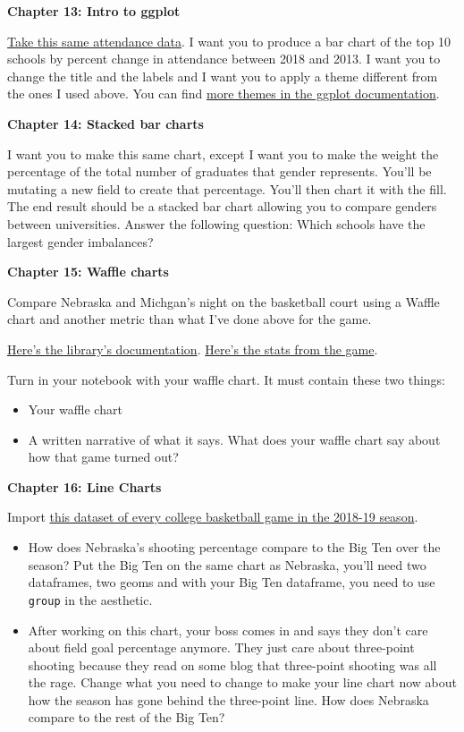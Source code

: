 \documentclass[]{book}
\providecommand{\tightlist}{%
  \setlength{\itemsep}{0pt}\setlength{\parskip}{0pt}}
\begin{document}
\textbf{Chapter 13: Intro to ggplot}

\href{https://unl.box.com/s/hvxmnxhr41x4ikgt3vk38aczcbrf97pn}{Take this same attendance data}. I want you to produce a bar chart of the top 10 schools by percent change in attendance between 2018 and 2013. I want you to change the title and the labels and I want you to apply a theme different from the ones I used above. You can find \href{https://ggplot2.tidyverse.org/reference/ggtheme.html}{more themes in the ggplot documentation}.

\textbf{Chapter 14: Stacked bar charts}

I want you to make this same chart, except I want you to make the weight the percentage of the total number of graduates that gender represents. You'll be mutating a new field to create that percentage. You'll then chart it with the fill. The end result should be a stacked bar chart allowing you to compare genders between universities. Answer the following question: Which schools have the largest gender imbalances?

\textbf{Chapter 15: Waffle charts}

Compare Nebraska and Michgan's night on the basketball court using a Waffle chart and another metric than what I've done above for the game.

\href{https://github.com/hrbrmstr/waffle}{Here's the library's documentation}.
\href{https://www.sports-reference.com/cbb/boxscores/2019-02-28-19-michigan.html}{Here's the stats from the game}.

Turn in your notebook with your waffle chart. It must contain these two things:

\begin{itemize}
\tightlist
\item
  Your waffle chart
\item
  A written narrative of what it says. What does your waffle chart say about how that game turned out?
\end{itemize}

\textbf{Chapter 16: Line Charts}

Import \href{https://unl.box.com/s/a8m91bro10t89watsyo13yjegb1fy009}{this dataset of every college basketball game in the 2018-19 season}.

\begin{itemize}
\item
  How does Nebraska's shooting percentage compare to the Big Ten over the season? Put the Big Ten on the same chart as Nebraska, you'll need two dataframes, two geoms and with your Big Ten dataframe, you need to use \texttt{group} in the aesthetic.
\item
  After working on this chart, your boss comes in and says they don't care about field goal percentage anymore. They just care about three-point shooting because they read on some blog that three-point shooting was all the rage. Change what you need to change to make your line chart now about how the season has gone behind the three-point line. How does Nebraska compare to the rest of the Big Ten?
\end{itemize}
\end{document}
